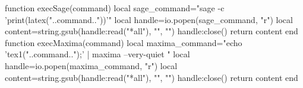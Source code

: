 \documentclass[a4paper]{ltjsarticle}
\begin{document}

\begin{luacode*}
function execSage(command)
  local sage_command="sage -c 'print(latex("..command.."))'"
  local handle=io.popen(sage_command, "r")
  local content=string.gsub(handle:read("*all"), "\n", "")
  handle:close()
  return content
end
function execMaxima(command)
  local maxima_command="echo 'tex1("..command..");' | maxima --very-quiet "
  local handle=io.popen(maxima_command, "r")
  local content=string.gsub(handle:read("*all"), "\n", "")
  handle:close()
  return content
end
\end{luacode*}


\end{document}
